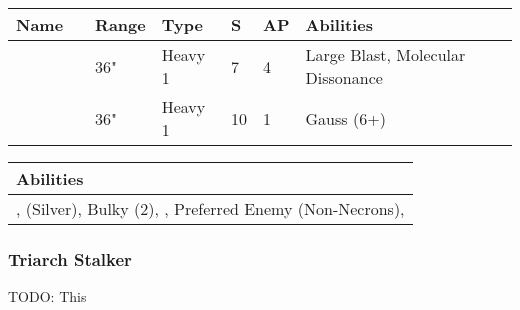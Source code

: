\noindent
\begin{tabular}{||m{110pt} m{30pt} m{31pt} m{55pt} m{12pt} m{12pt} m{210pt}||}
	\hline
	Name & & Range & Type & S & AP & Abilities \\
	\hline
	\quickref{Enmitic Exterminator} &  & 36" & Heavy 1 & 7 & 4 & Large Blast, Molecular Dissonance \\
	\quickref{Gauss Destructor} &  & 36" & Heavy 1 & 10 & 1 &  Gauss (6+) \\
	\hline
\end{tabular}

\noindent
\begin{tabular}{||m{532pt}||}
	\hline
	Abilities \\
	\hline
	\quickref{Annihilation Protocols}, \quickref{Awakening Protocols} (Silver), Bulky (2), \quickref{Living Metal}, Preferred Enemy (Non-Necrons), \quickref{Reanimation Protocols} \\
	\hline
\end{tabular}


\newpage
\subsubsection{Triarch Stalker}
TODO: This
